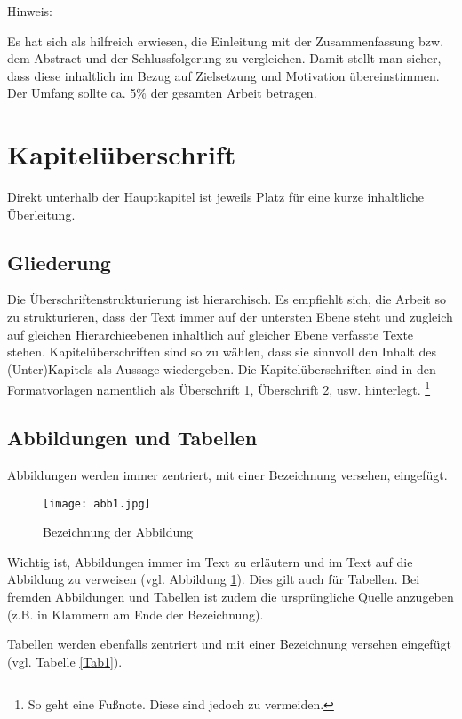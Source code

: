 \documentclass[12pt, oneside]{article}
\begin{document}
Hinweis:

Es hat sich als hilfreich erwiesen, die Einleitung mit der Zusammenfassung bzw. dem Abstract und der Schlussfolgerung zu vergleichen. Damit stellt man sicher, dass diese inhaltlich im Bezug auf Zielsetzung und Motivation übereinstimmen. Der Umfang sollte ca. 5\% der gesamten Arbeit betragen.

\newpage

\section{Kapitelüberschrift} \label{Kapitelüberschrift}
Direkt unterhalb der Hauptkapitel ist jeweils Platz für eine kurze inhaltliche Überleitung.  

\subsection{Gliederung}
Die Überschriftenstrukturierung ist hierarchisch. Es empfiehlt sich, die Arbeit so zu strukturieren, dass der Text immer auf der untersten Ebene steht und zugleich auf gleichen Hierarchieebenen inhaltlich auf gleicher Ebene verfasste Texte stehen. Kapitelüberschriften sind so zu wählen, dass sie sinnvoll den Inhalt des (Unter)Kapitels als Aussage wiedergeben. Die Kapitelüberschriften sind in den Formatvorlagen namentlich als Überschrift 1, Überschrift 2, usw. hinterlegt. \footnote{So geht eine Fußnote. Diese sind jedoch zu vermeiden.}

\subsection{Abbildungen und Tabellen}
Abbildungen werden immer zentriert, mit einer Bezeichnung versehen, eingefügt. 
\begin{figure}[!h]
    \centering
    \texttt{[image: abb1.jpg]}
    \caption{Bezeichnung der Abbildung}
    \label{fig:beispielbild}
\end{figure}
\bigskip
\newline
Wichtig ist, Abbildungen immer im Text zu erläutern und im Text auf die Abbildung zu verweisen (vgl. Abbildung \ref{fig:beispielbild}). Dies gilt auch für Tabellen. Bei fremden Abbildungen und Tabellen ist zudem die ursprüngliche Quelle anzugeben (z.B. in Klammern am Ende der Bezeichnung).

Tabellen werden ebenfalls zentriert und mit einer Bezeichnung versehen eingefügt (vgl. Tabelle \ref{Tab1}).
\end{document}
